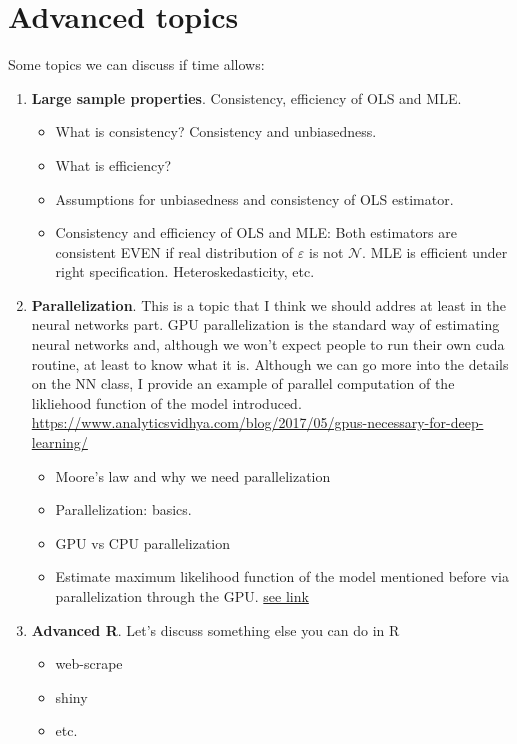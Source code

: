 \documentclass[11pt,letterpaper]{article}
\begin{document}
\section{Advanced topics}
Some topics we can discuss if time allows:
\begin{enumerate}
    \item \textbf{Large sample properties}. Consistency, efficiency of OLS and MLE.
    \begin{itemize}
    \item What is consistency? Consistency and unbiasedness.
    \item What is efficiency?
    \item Assumptions for unbiasedness and consistency of OLS estimator. 
    \item Consistency and efficiency of OLS and MLE: Both estimators are consistent EVEN if real distribution of $\varepsilon$ is not $\mathcal{N}$. MLE is efficient under right specification. Heteroskedasticity, etc. 
    \end{itemize}
    \item \textbf{Parallelization}. This is a topic that I think we should addres at least in the neural networks part. GPU parallelization is the standard way of estimating neural networks and, although we won't expect people to run their own cuda routine, at least to know what it is. Although we can go more into the details on the NN class, I provide an example of parallel computation of the likliehood function of the model introduced.  \href{https://www.analyticsvidhya.com/blog/2017/05/gpus-necessary-for-deep-learning/}{https://www.analyticsvidhya.com/blog/2017/05/gpus-necessary-for-deep-learning/}
    \begin{itemize}
        \item Moore's law and why we need parallelization
        \item Parallelization: basics. 
        \item GPU vs CPU parallelization
        \item Estimate maximum likelihood function of the model mentioned before via parallelization through the GPU. \href{https://github.com/rodazuero/samplecode/blob/master/CUDA/mle_mincer/CUDAMLE.cu}{see link}
    \end{itemize}
    \item \textbf{Advanced R}. Let's discuss something else you can do in R
    \begin{itemize}
        \item web-scrape
        \item shiny
        \item etc. 
    \end{itemize}
\end{enumerate}
\end{document}

